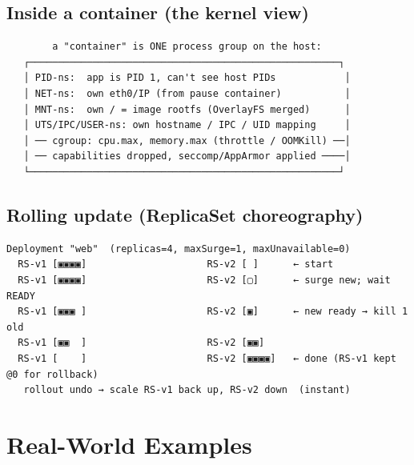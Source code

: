 \documentclass[11pt]{article}
\begin{document}
\subsection{Inside a container (the kernel view)}\label{inside-a-container-the-kernel-view}

\setcodelang{}

\begin{verbatim}
        a "container" is ONE process group on the host:
   ┌──────────────────────────────────────────────────────┐
   │ PID-ns:  app is PID 1, can't see host PIDs            │
   │ NET-ns:  own eth0/IP (from pause container)           │
   │ MNT-ns:  own / = image rootfs (OverlayFS merged)      │
   │ UTS/IPC/USER-ns: own hostname / IPC / UID mapping     │
   │ ── cgroup: cpu.max, memory.max (throttle / OOMKill) ──│
   │ ── capabilities dropped, seccomp/AppArmor applied ────│
   └──────────────────────────────────────────────────────┘
\end{verbatim}

\subsection{Rolling update (ReplicaSet choreography)}\label{rolling-update-replicaset-choreography}

\setcodelang{}

\begin{verbatim}
Deployment "web"  (replicas=4, maxSurge=1, maxUnavailable=0)
  RS-v1 [▣▣▣▣]                     RS-v2 [ ]      ← start
  RS-v1 [▣▣▣▣]                     RS-v2 [▢]      ← surge new; wait READY
  RS-v1 [▣▣▣ ]                     RS-v2 [▣]      ← new ready → kill 1 old
  RS-v1 [▣▣  ]                     RS-v2 [▣▣]
  RS-v1 [    ]                     RS-v2 [▣▣▣▣]   ← done (RS-v1 kept @0 for rollback)
   rollout undo → scale RS-v1 back up, RS-v2 down  (instant)
\end{verbatim}

\section{Real-World Examples}\label{real-world-examples}
\end{document}
